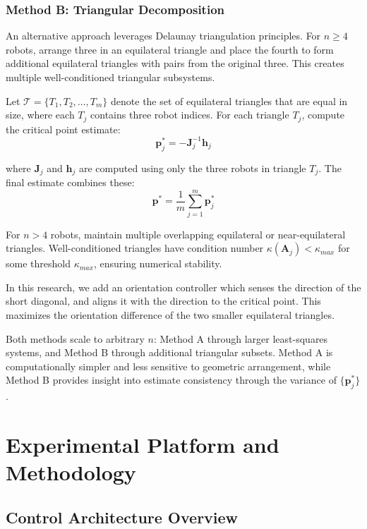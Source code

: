 \documentclass[lettersize,journal]{IEEEtran}
\begin{document}
\subsubsection{Method B: Triangular Decomposition}

An alternative approach leverages Delaunay triangulation principles. For $n \ge 4$ robots, arrange three in an equilateral triangle and place the fourth to form additional equilateral triangles with pairs from the original three. This creates multiple well-conditioned triangular subsystems.

Let $\mathcal{T} = \{T_1, T_2, \ldots, T_m\}$ denote the set of equilateral triangles that are equal in size, where each $T_j$ contains three robot indices. For each triangle $T_j$, compute the critical point estimate:
\begin{equation}
\mathbf{p}^*_j = -\mathbf{J}_j^{-1}\mathbf{h}_j
\end{equation}

where $\mathbf{J}_j$ and $\mathbf{h}_j$ are computed using only the three robots in triangle $T_j$. The final estimate combines these:
\begin{equation}
\mathbf{p}^* = \frac{1}{m}\sum_{j=1}^{m} \mathbf{p}^*_j
\end{equation}

For $n > 4$ robots, maintain multiple overlapping equilateral or near-equilateral triangles. Well-conditioned triangles have condition number $\kappa(\mathbf{A}_j) < \kappa_{max}$ for some threshold $\kappa_{max}$, ensuring numerical stability.

In this research, we add an orientation controller which senses the direction of the short diagonal, and aligns it with the direction to the critical point. This maximizes the orientation difference of the two smaller equilateral triangles.

Both methods scale to arbitrary $n$: Method A through larger least-squares systems, and Method B through additional triangular subsets. Method A is computationally simpler and less sensitive to geometric arrangement, while Method B provides insight into estimate consistency through the variance of $\{\mathbf{p}^*_j\}$.

\section{Experimental Platform and Methodology}

\subsection{Control Architecture Overview}
\end{document}
